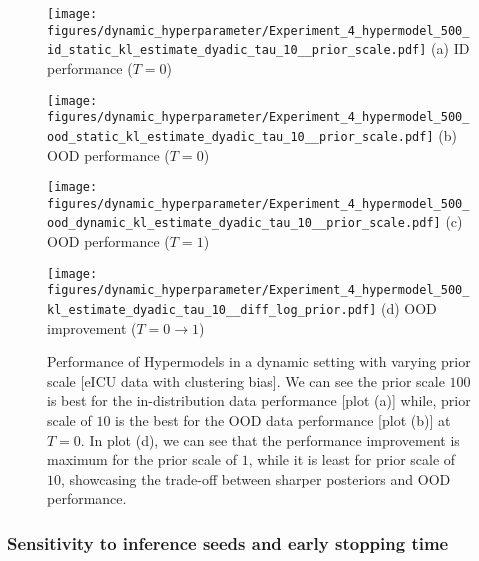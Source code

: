 \begin{figure}[h]
\centering
\begin{minipage}[b]{0.24\textwidth}
\centering
\texttt{[image: figures/dynamic\_hyperparameter/Experiment\_4\_hypermodel\_500\_id\_static\_kl\_estimate\_dyadic\_tau\_10\_\_prior\_scale.pdf]}
{\small{{(a)} ID performance ($T=0$) }}
\end{minipage}
\hfill
\begin{minipage}[b]{0.24\textwidth}
\centering \texttt{[image: figures/dynamic\_hyperparameter/Experiment\_4\_hypermodel\_500\_ood\_static\_kl\_estimate\_dyadic\_tau\_10\_\_prior\_scale.pdf]}
{\small{{(b)} OOD performance ($T=0$) } }
\end{minipage}
\hfill
\begin{minipage}[b]{0.24\textwidth}
\centering \texttt{[image: figures/dynamic\_hyperparameter/Experiment\_4\_hypermodel\_500\_ood\_dynamic\_kl\_estimate\_dyadic\_tau\_10\_\_prior\_scale.pdf]}
{\small{{(c)} OOD performance ($T=1$)}}
\end{minipage}
\hfill
\begin{minipage}[b]{0.24\textwidth}
\centering \texttt{[image: figures/dynamic\_hyperparameter/Experiment\_4\_hypermodel\_500\_kl\_estimate\_dyadic\_tau\_10\_\_diff\_log\_prior.pdf]}
{\small{{(d)} OOD improvement ($T=0 \to 1$) }}
\end{minipage}
\caption{Performance of Hypermodels in a dynamic setting with varying prior scale [eICU data with clustering bias]. We can see the prior scale $100$ is best for the in-distribution data performance [plot (a)] while, prior scale of $10$ is the best for the OOD data performance [plot (b)] at $T=0$. In plot (d), we can see that the performance improvement is maximum for the prior scale of $1$, while it is least for prior scale of $10$, showcasing the trade-off between sharper posteriors and OOD performance. 
}
\label{fig:Hypermodel_prior_scale}
\end{figure}






\subsubsection{Sensitivity to inference seeds and early stopping time}

